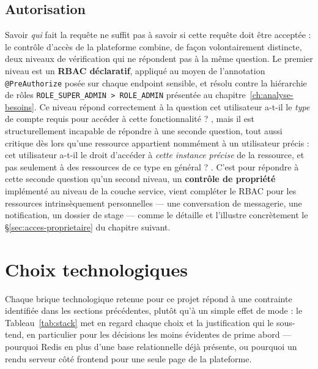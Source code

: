 \subsection{Autorisation}
\label{sec:autorisation}

Savoir \emph{qui} fait la requête ne suffit pas à savoir si cette requête
doit être acceptée : le contrôle d'accès de la plateforme combine, de
façon volontairement distincte, deux niveaux de vérification qui ne
répondent pas à la même question. Le premier niveau est un
\textbf{RBAC déclaratif}, appliqué au moyen de l'annotation
\texttt{@PreAuthorize} posée sur chaque endpoint sensible, et résolu
contre la hiérarchie de rôles \texttt{ROLE\_SUPER\_ADMIN > ROLE\_ADMIN}
présentée au chapitre~\ref{ch:analyse-besoins}. Ce niveau répond correctement
à la question \og cet utilisateur a-t-il le \emph{type} de compte requis
pour accéder à cette fonctionnalité ? \fg, mais il est structurellement
incapable de répondre à une seconde question, tout aussi critique dès lors
qu'une ressource appartient nommément à un utilisateur précis : \og cet
utilisateur a-t-il le droit d'accéder à \emph{cette instance précise} de
la ressource, et pas seulement à des ressources de ce type en général ?
\fg. C'est pour répondre à cette seconde question qu'un second niveau, un
\textbf{contrôle de propriété} implémenté au niveau de la couche service,
vient compléter le RBAC pour les ressources intrinsèquement personnelles
--- une conversation de messagerie, une notification, un dossier de stage
--- comme le détaille et l'illustre concrètement le
\S\ref{sec:acces-proprietaire} du chapitre suivant.

\section{Choix technologiques}

Chaque brique technologique retenue pour ce projet répond à une
contrainte identifiée dans les sections précédentes, plutôt qu'à un
simple effet de mode : le Tableau~\ref{tab:stack} met en regard chaque
choix et la justification qui le sous-tend, en particulier pour les
décisions les moins évidentes de prime abord --- pourquoi Redis en plus
d'une base relationnelle déjà présente, ou pourquoi un rendu serveur côté
frontend pour une seule page de la plateforme.

